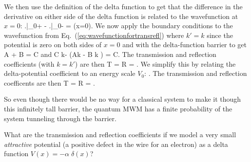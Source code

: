 We then use the definition of the delta function to get that the difference in the derivative on either side of the delta function is related to the wavefunction at $x=0$:
\beq
\left.\right|_{0+} - \left.\right|_{0-} = \psi(x=0).
\label{eq:deltadifferenceatzero}
\eeq
We now apply the boundary conditions to the wavefunction from Eq.~(\ref{eq:wavefunctionfortransrefl}) where $k' = k$ since the potential is zero on both sides of $x=0$ and with the delta-function barrier to get
\beq
A + B = C
\eeq
and
\beq
C \I k- \left(A\I k - B \I k \right) = C.
\eeq
The transmission and reflection coefficients (with $k=k'$) are then
\beq
T =   R = .
\eeq{}
We simplify this by relating the delta-potential coefficient to an energy scale $V_0$:
\beq
\alpha \equiv {}.
\eeq{}%
The transmission and reflection coefficents are then
\beq
T =   R = .
\eeq%
\begin{marginfigure}[1cm]
\centering
{}
\end{marginfigure}%
So even though there would be no way for a classical system to make it though this infinitely tall barrier, the quantum MWM has a finite probability of the system tunneling through the barrier.

\begin{exercise}
What are the transmission and reflection coefficients if we model a very small {\em attractive} potential (\ie a positive defect in the wire for an electron) as a delta function $V(x) = -\alpha\;\delta(x)$?
\end{exercise}




